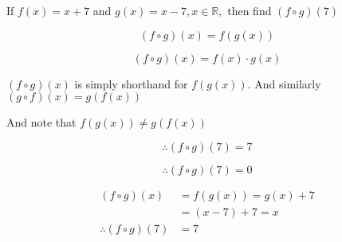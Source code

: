 \documentclass[14pt,fleqn]{extarticle}
\begin{document}
\begin{question}
\statement
	
If $f(x) = x + 7$ and $g(x) = x-7, x\in\mathbb{R},$ 
then find $(f\circ g)(7)$
%
\begin{step}
	\begin{options}
		\correct

		\[(f\circ g)(x) = f\left( g\left( x\right)\right) \]

		\incorrect

		\[(f\circ g)(x) = f(x)\cdot g(x) \]

	\end{options}
	\reason

$(f\circ g)(x)$ is simply shorthand for $ f\left( g\left( x\right)\right)$.
And similarly $\left(g\circ f \right)(x) = g \left( f \left(x \right) \right)$\newline 

And note that $ f \left(g(x) \right)\neq g \left(f(x) \right)$
\end{step}
\begin{step}
	\begin{options}
		\correct

		\[\therefore (f\circ g)(7) = 7 \]

		\incorrect

		\[\therefore (f\circ g)(7) = 0\]

	\end{options}
	\reason

	\begin{align}
(f\circ g)(x) &= f\left( g\left( x \right) \right) = g(x) + 7 \\
&= (x-7) + 7 = x \\ 
\therefore (f\circ g)(7) &= 7
\end{align} 
\end{step}
\end{question}
\end{document}
